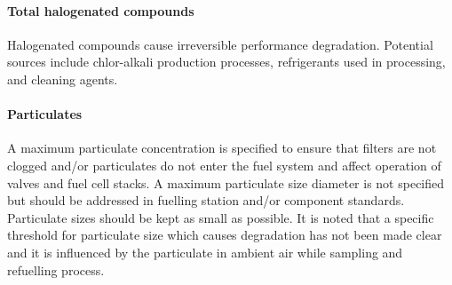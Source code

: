 \paragraph{Total halogenated compounds} 
Halogenated compounds cause irreversible performance degradation. 
Potential sources include chlor-alkali 
production processes, refrigerants used in processing, and cleaning agents.

\paragraph{Particulates}
A maximum particulate concentration is specified to ensure that filters are not clogged and/or particulates 
do not enter the fuel system and affect operation of valves and fuel cell stacks. A maximum particulate size 
diameter is not specified but should be addressed in fuelling station and/or component standards. 
Particulate sizes should be kept as small as possible. It is noted that a specific threshold for 
particulate size which causes degradation has not been made clear and it is influenced by the particulate 
in ambient air while sampling and refuelling process.

